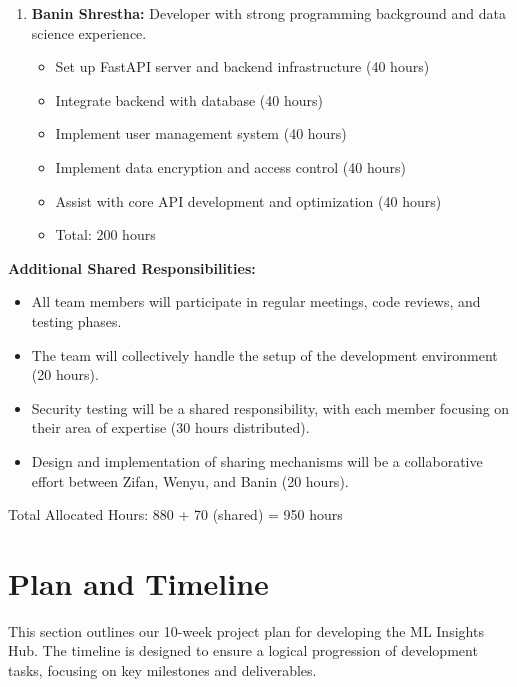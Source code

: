 \documentclass[12pt]{article}
\begin{document}
\begin{enumerate}
    \item \textbf{Banin Shrestha:} Developer with strong programming background and data science experience.
    \begin{itemize}
        \item Set up FastAPI server and backend infrastructure (40 hours)
        \item Integrate backend with database (40 hours)
        \item Implement user management system (40 hours)
        \item Implement data encryption and access control (40 hours)
        \item Assist with core API development and optimization (40 hours)
        \item Total: 200 hours
    \end{itemize}
\end{enumerate}

\textbf{Additional Shared Responsibilities:}
\begin{itemize}
    \item All team members will participate in regular meetings, code reviews, and testing phases.
    \item The team will collectively handle the setup of the development environment (20 hours).
    \item Security testing will be a shared responsibility, with each member focusing on their area of expertise (30 hours distributed).
    \item Design and implementation of sharing mechanisms will be a collaborative effort between Zifan, Wenyu, and Banin (20 hours).
\end{itemize}

Total Allocated Hours: 880 + 70 (shared) = 950 hours


\section{Plan and Timeline}
This section outlines our 10-week project plan for developing the ML Insights Hub. The timeline is designed to ensure a logical progression of development tasks, focusing on key milestones and deliverables.
\end{document}
